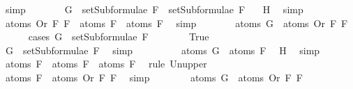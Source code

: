 \begin{isabellebody}
\ simp\isanewline
\ \ \ \ \isamarkupfalse%
\ \isamarkupfalse%
\ {}{\isacharcolon}{\isachardoublequoteopen}G\ {\isasymin}\ setSubformulae\ F{}\ {\isasymunion}\ setSubformulae\ F{}{\isachardoublequoteclose}\ \isamarkupfalse%
\ {}\ H{}\ \isamarkupfalse%
\ simp\isanewline
\ \ \ \ \isamarkupfalse%
\ {\isachardoublequoteopen}atoms\ {\isacharparenleft}Or\ F{}\ F{}{\isacharparenright}\ {\isacharequal}\ atoms\ F{}\ {\isasymunion}\ atoms\ F{}{\isachardoublequoteclose}\ \isamarkupfalse%
\ simp\isanewline
\ \ \ \ \isamarkupfalse%
\ \isamarkupfalse%
\ {\isachardoublequoteopen}atoms\ G\ {\isasymsubseteq}\ atoms\ {\isacharparenleft}Or\ F{}\ F{}{\isacharparenright}{\isachardoublequoteclose}\isanewline
\ \ \ \ \isamarkupfalse%
\ {\isacharparenleft}cases\ {\isachardoublequoteopen}G\ {\isasymin}\ setSubformulae\ F{}{\isachardoublequoteclose}{\isacharparenright}\isanewline
\ \ \ \ \ \ \isamarkupfalse%
\ True\isanewline
\ \ \ \ \ \ \isamarkupfalse%
\ \isamarkupfalse%
\ {\isachardoublequoteopen}G\ {\isasymin}\ setSubformulae\ F{}{\isachardoublequoteclose}\ \isamarkupfalse%
\ simp\isanewline
\ \ \ \ \ \ \isamarkupfalse%
\ \isamarkupfalse%
\ {}{\isacharcolon}{\isachardoublequoteopen}atoms\ G\ {\isasymsubseteq}\ atoms\ F{}{\isachardoublequoteclose}\ \isamarkupfalse%
\ H{}\ \isamarkupfalse%
\ simp\isanewline
\ \ \ \ \ \ \isamarkupfalse%
\ {\isachardoublequoteopen}atoms\ F{}\ {\isasymsubseteq}\ atoms\ F{}\ {\isasymunion}\ atoms\ F{}{\isachardoublequoteclose}\ \isamarkupfalse%
\ {\isacharparenleft}rule\ Un{\isacharunderscore}upper{}{\isacharparenright}\isanewline
\ \ \ \ \ \ \isamarkupfalse%
\ \isamarkupfalse%
\ {}{\isacharcolon}{\isachardoublequoteopen}atoms\ F{}\ {\isasymsubseteq}\ atoms\ {\isacharparenleft}Or\ F{}\ F{}{\isacharparenright}{\isachardoublequoteclose}\ \isamarkupfalse%
\ simp\isanewline
\ \ \ \ \ \ \isamarkupfalse%
\ {\isachardoublequoteopen}atoms\ G\ {\isasymsubseteq}\ atoms\ {\isacharparenleft}Or\ F{}\ F{}{\isacharparenright}{\isachardoublequoteclose}\ \isamarkupfalse%

\end{isabellebody}
